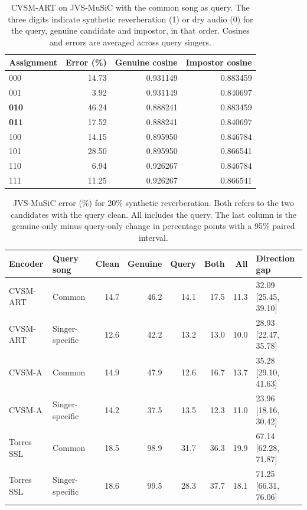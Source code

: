 \documentclass[10pt,a4paper]{article}
\begin{document}
\begin{table}[htbp]
\centering\footnotesize
\setlength{\tabcolsep}{4pt}
\caption{CVSM-ART on JVS-MuSiC with the common song as query. The three digits indicate synthetic reverberation (1) or dry audio (0) for the query, genuine candidate and impostor, in that order. Cosines and errors are averaged across query singers.}
\label{tab:jvs-cells}
\begin{tabular}{@{}lrrr@{}}
\toprule
Assignment & Error (\%) & Genuine cosine & Impostor cosine \\
\midrule
000 & 14.73 & 0.931149 & 0.883459 \\
001 & 3.92 & 0.931149 & 0.840697 \\
\textbf{010} & 46.24 & 0.888241 & 0.883459 \\
\textbf{011} & 17.52 & 0.888241 & 0.840697 \\
100 & 14.15 & 0.895950 & 0.846784 \\
101 & 28.50 & 0.895950 & 0.866541 \\
110 & 6.94 & 0.926267 & 0.846784 \\
111 & 11.25 & 0.926267 & 0.866541 \\
\bottomrule
\end{tabular}
\end{table}

\begin{table}[t]
\centering\small
\caption{JVS-MuSiC error (\%) for 20\% synthetic reverberation. Both refers to the two candidates with the query clean. All includes the query. The last column is the genuine-only minus query-only change in percentage points with a 95\% paired interval.}
\label{tab:jvs}
\begin{tabularx}{\linewidth}{@{}lYrrrrrl@{}}
\toprule
Encoder & Query song & Clean & Genuine & Query & Both & All & Direction gap \\
\midrule
CVSM-ART & Common & 14.7 & 46.2 & 14.1 & 17.5 & 11.3 & 32.09 [25.45, 39.10] \\
CVSM-ART & Singer-specific & 12.6 & 42.2 & 13.2 & 13.0 & 10.0 & 28.93 [22.47, 35.78] \\
CVSM-A & Common & 14.9 & 47.9 & 12.6 & 16.7 & 13.7 & 35.28 [29.10, 41.63] \\
CVSM-A & Singer-specific & 14.2 & 37.5 & 13.5 & 12.3 & 11.0 & 23.96 [18.16, 30.42] \\
Torres SSL & Common & 18.5 & 98.9 & 31.7 & 36.3 & 19.9 & 67.14 [62.28, 71.87] \\
Torres SSL & Singer-specific & 18.6 & 99.5 & 28.3 & 37.7 & 18.1 & 71.25 [66.31, 76.06] \\
\bottomrule
\end{tabularx}
\end{table}
\end{document}

